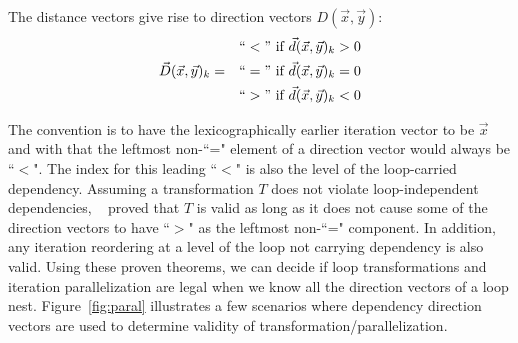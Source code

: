 The distance vectors give rise to direction vectors $D(\vec{x},\vec{y})$:
\begin{equation*}
\begin{aligned}
  & & ``<" \text{ if } \vec{d}(\vec{x},\vec{y})_k>0 \\
 \vec{D}(\vec{x},\vec{y})_k = &   & ``=" \text{ if } \vec{d}(\vec{x},\vec{y})_k=0\\
 & & ``>" \text{ if } \vec{d}(\vec{x},\vec{y})_k<0
\end{aligned}
\end{equation*}


The convention is to have the lexicographically earlier iteration vector to be
$\vec{x}$ and with that the leftmost non-``=" element of a direction vector would always be ``$<$". 
The index for this leading ``$<$" is also the level of the  loop-carried dependency. 
Assuming a transformation $T$ does not violate loop-independent dependencies,
~\cite{Kennedy:2001:OCM:502981} proved that $T$ is valid as long as
it does not cause some of the direction vectors to have ``$>$" as the leftmost non-``=" component. In addition, any iteration reordering at a level of the loop not carrying dependency is also valid. Using these proven theorems, we can
decide if loop transformations and iteration parallelization are legal when we know all the direction vectors of a loop nest. Figure~\ref{fig:paral} illustrates a
few scenarios where dependency direction vectors are used to determine validity
of transformation/parallelization.











